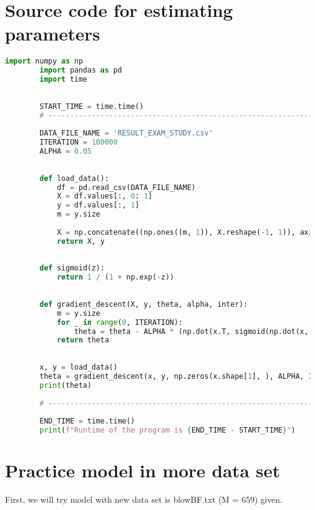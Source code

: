 \documentclass{article}
\begin{document}
\section {Source code for estimating parameters} 
    \begin{lstlisting}[language=Python, caption=Source code for sample 1]
        import numpy as np
        import pandas as pd
        import time
        
        
        START_TIME = time.time()
        # ------------------------------------------------------------------
        
        DATA_FILE_NAME = 'RESULT_EXAM_STUDY.csv'
        ITERATION = 100000
        ALPHA = 0.05 
        
        
        def load_data():
            df = pd.read_csv(DATA_FILE_NAME)
            X = df.values[:, 0: 1]
            y = df.values[:, 1]
            m = y.size
        
            X = np.concatenate((np.ones((m, 1)), X.reshape(-1, 1)), axis=1)
            return X, y
        
        
        def sigmoid(z):
            return 1 / (1 + np.exp(-z))
        
        
        def gradient_descent(X, y, theta, alpha, inter):
            m = y.size
            for _ in range(0, ITERATION):
                theta = theta - ALPHA * (np.dot(x.T, sigmoid(np.dot(x, theta)) - y)) / m
            return theta
        
        
        x, y = load_data()
        theta = gradient_descent(x, y, np.zeros(x.shape[1], ), ALPHA, ITERATION)
        print(theta)
        
        # ------------------------------------------------------------------
        
        END_TIME = time.time()
        print(f"Runtime of the program is {END_TIME - START_TIME}")
    \end{lstlisting}
    
\section{Practice model in more data set} 
First, we will try model with new data set is blowBF.txt (M = 659) given. 
\end{document}
